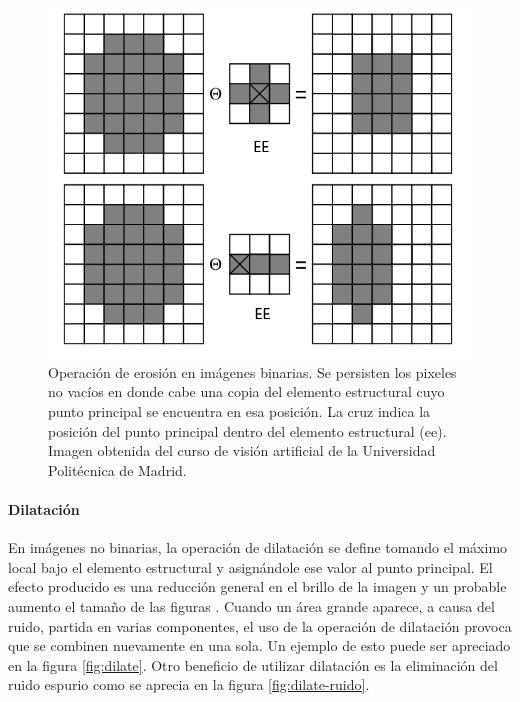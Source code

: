 \begin{figure}[tpb]
\begin{center}
  \includegraphics[scale=0.4]{figuras/erode-sample.png}
\end{center}
  \caption{\small Operación de erosión en imágenes binarias. Se persisten los pixeles no vacíos en donde cabe una copia del elemento estructural cuyo punto principal se encuentra en esa posición. La cruz indica la posición del punto principal dentro del elemento estructural (ee). Imagen obtenida del curso de visión artificial de la Universidad Politécnica de Madrid. } 
  \label{fig:erode-sample}
\end{figure}

	\paragraph{Dilatación}
En imágenes no binarias, la operación de dilatación se define 
tomando el máximo local bajo el elemento estructural y asignándole ese valor al punto principal. El efecto producido es una reducción general en el brillo de la imagen y un probable aumento el tamaño de las figuras \cite{nasa-dilate-erode}.  Cuando un área grande aparece, a causa del ruido, partida en varias componentes, el uso de la operación de dilatación provoca que  se combinen nuevamente en una sola. Un ejemplo de esto puede ser apreciado en la figura \ref{fig:dilate}. Otro beneficio de utilizar dilatación es la eliminación del ruido espurio como se aprecia en la figura \ref{fig:dilate-ruido}.

